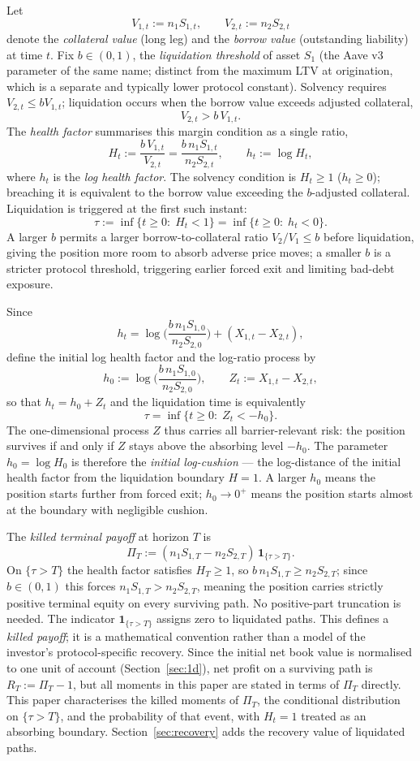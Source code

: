 \documentclass[11pt]{article}
\newcommand{\one}{\mathbf{1}}
\theoremstyle{plain}
\theoremstyle{definition}
\theoremstyle{remark}
\begin{document}
Let
\[
V_{1,t}:=n_1 S_{1,t},\qquad V_{2,t}:=n_2 S_{2,t}
\]
denote the \emph{collateral value} (long leg) and the \emph{borrow value} (outstanding liability) at
time $t$. Fix $b\in(0,1)$, the \emph{liquidation threshold} of asset $S_1$ (the Aave v3 parameter of the
same name; distinct from the maximum LTV at origination, which is a separate and typically lower
protocol constant). Solvency requires $V_{2,t}\le bV_{1,t}$; liquidation occurs when the
borrow value exceeds adjusted collateral,
\[
V_{2,t}>b\,V_{1,t}.
\]
The \emph{health factor} summarises this margin condition as a single ratio,
\begin{equation}\label{eq:health-factor}
H_t := \frac{b\,V_{1,t}}{V_{2,t}} = \frac{b\,n_1 S_{1,t}}{n_2 S_{2,t}},
\qquad
h_t := \log H_t,
\end{equation}
where $h_t$ is the \emph{log health factor}. The solvency condition is $H_t\ge 1$
($h_t\ge 0$); breaching it is equivalent to the borrow value exceeding the $b$-adjusted collateral.
Liquidation is triggered at the first such instant:
\[
\tau:=\inf\{t\ge 0:\;H_t<1\} = \inf\{t\ge 0:\;h_t<0\}.
\]
A larger $b$ permits a larger borrow-to-collateral ratio $V_2/V_1\le b$ before liquidation,
giving the position more room to absorb adverse price moves; a smaller $b$ is a stricter
protocol threshold, triggering earlier forced exit and limiting bad-debt exposure.

Since
\[
h_t
=
\log\!\Big(\frac{b\,n_1S_{1,0}}{n_2S_{2,0}}\Big)+(X_{1,t}-X_{2,t}),
\]
define the initial log health factor and the log-ratio process by
\[
h_0:=\log\!\Big(\frac{b\,n_1S_{1,0}}{n_2S_{2,0}}\Big),
\qquad
Z_t:=X_{1,t}-X_{2,t},
\]
so that $h_t=h_0+Z_t$ and the liquidation time is equivalently
\[
\tau=\inf\{t\ge 0:\; Z_t<-h_0\}.
\]
The one-dimensional process $Z$ thus carries all barrier-relevant risk: the position survives if and only if
$Z$ stays above the absorbing level $-h_0$. The parameter $h_0 = \log H_0$ is therefore the
\emph{initial log-cushion} — the log-distance of the initial health factor from the liquidation
boundary $H=1$. A larger $h_0$ means the position starts further from forced exit; $h_0\to 0^+$
means the position starts almost at the boundary with negligible cushion.

The \emph{killed terminal payoff} at horizon $T$ is
\[
\Pi_T:=(n_1S_{1,T}-n_2S_{2,T})\,\one_{\{\tau>T\}}.
\]
On $\{\tau>T\}$ the health factor satisfies $H_T\ge 1$, so $b\,n_1S_{1,T}\ge n_2S_{2,T}$;
since $b\in(0,1)$ this forces $n_1S_{1,T}>n_2S_{2,T}$, meaning the position carries strictly
positive terminal equity on every surviving path. No positive-part truncation is needed.
The indicator $\one_{\{\tau>T\}}$ assigns zero to liquidated paths. This defines a
\emph{killed payoff}; it is a mathematical convention rather than a model of the investor's
protocol-specific recovery.
Since the initial net book value is normalised to one unit of account (Section~\ref{sec:1d}),
net profit on a surviving path is $R_T:=\Pi_T-1$, but all moments in this paper are stated in
terms of $\Pi_T$ directly.
This paper characterises the killed moments of $\Pi_T$, the conditional distribution on
$\{\tau>T\}$, and the probability of that event, with $H_t=1$ treated as an absorbing
boundary. Section~\ref{sec:recovery} adds the recovery value of liquidated paths.
\end{document}

